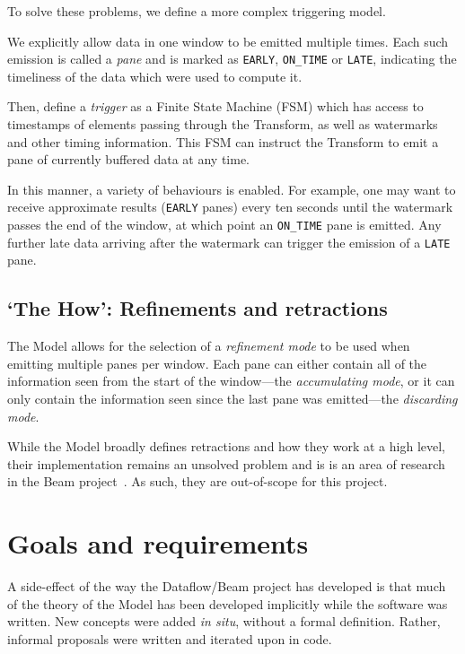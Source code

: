 To solve these problems, we define a more complex triggering model.

We explicitly allow data in one window to be emitted multiple times.
Each such emission is called a \emph{pane} and is marked as \verb|EARLY|, \verb|ON_TIME| or \verb|LATE|, indicating the timeliness of the data which were used to compute it.

Then, define a \emph{trigger} as a Finite State Machine (FSM) which has access to timestamps of elements passing through the Transform, as well as watermarks and other timing information.
This FSM can instruct the Transform to emit a pane of currently buffered data at any time.

In this manner, a variety of behaviours is enabled.
For example, one may want to receive approximate results (\verb|EARLY| panes) every ten seconds until the watermark passes the end of the window, at which point an \verb|ON_TIME| pane is emitted.
Any further late data arriving after the watermark can trigger the emission of a \verb|LATE| pane.

\subsection{`The How': Refinements and retractions}\label{sec:prep:dataflow:how}

The Model allows for the selection of a \emph{refinement mode} to be used when emitting multiple panes per window.
Each pane can either contain all of the information seen from the start of the window---the \emph{accumulating mode}, or it can only contain the information seen since the last pane was emitted---the \emph{discarding mode}.

While the Model broadly defines retractions and how they work at a high level, their implementation remains an unsolved problem and is is an area of research in the Beam project~\cite{JIRA-retractions}.
As such, they are out-of-scope for this project.

\section{Goals and requirements}\label{sec:prep:goals}

A side-effect of the way the Dataflow/Beam project has developed is that much of the theory of the Model has been developed implicitly while the software was written.
New concepts were added \emph{in situ}, without a formal definition.
Rather, informal proposals were written and iterated upon in code.

